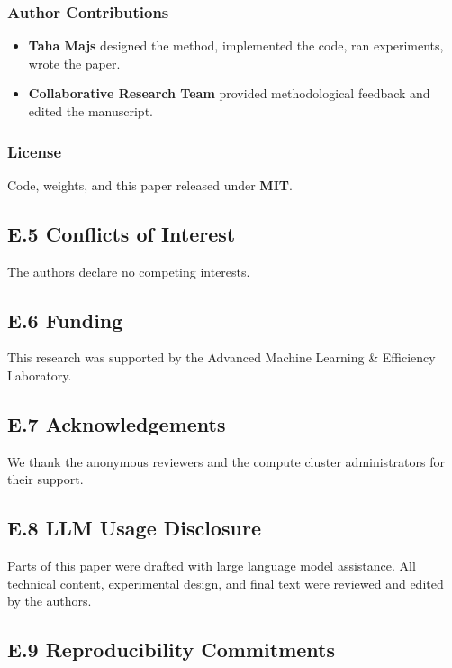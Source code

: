 \subsubsection{Author Contributions}

\begin{itemize}
\item \textbf{Taha Majs} designed the method, implemented the code, ran
  experiments, wrote the paper.
\item \textbf{Collaborative Research Team} provided methodological feedback and edited the manuscript.

\end{itemize}
\subsubsection{License}

Code, weights, and this paper released under \textbf{MIT}.

\subsection{E.5 Conflicts of Interest}

The authors declare no competing interests.

\subsection{E.6 Funding}

This research was supported by the Advanced Machine Learning \& Efficiency Laboratory.

\subsection{E.7 Acknowledgements}

We thank the anonymous reviewers and the compute cluster administrators for their support.

\subsection{E.8 LLM Usage Disclosure}

Parts of this paper were drafted with large language model assistance. All 
technical content, experimental design, and final text were reviewed and 
edited by the authors.

\subsection{E.9 Reproducibility Commitments}

